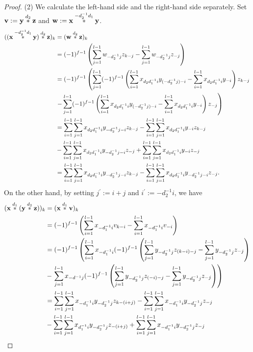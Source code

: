 \documentclass[a4paper, 11pt]{amsart}
\theoremstyle{plain}
\theoremstyle{definition}
\numberwithin{equation}{section}
\begin{document}
\begin{proof}
(2) We calculate the left-hand side and the right-hand side separately. 
Set ${\bf v}:={\bf y}\overset{d_2}{\ast}{\bf z}$ and ${\bf w}:={\bf x}\overset{-d_2^{-1}d_1}{\ast}{\bf y}$. 
\begin{align*}
(({\bf x}\overset{-d_2^{-1}d_1}{\ast}{\bf y})\overset{d_2}{\ast}{\bf z})_k&=({\bf w}\overset{d_2}{\ast}{\bf z})_k\\
&=(-1)^{f-1}\left( \sum_{j=1}^{l-1}w_{-d_2^{-1}j}z_{k-j} - \sum_{j=1}^{l-1}w_{-d_2^{-1}j}z_{-j} \right)\\
&=(-1)^{f-1}\left( \sum_{j=1}^{l-1}(-1)^{f-1}\left( \sum_{i=1}^{l-1}x_{d_2d_1^{-1}i}y_{(-d_2^{-1}j)-i} - \sum_{i=1}^{l-1}x_{d_2d_1^{-1}i}y_{-i} \right)z_{k-j}\right.\\
& \left. - \sum_{j=1}^{l-1}(-1)^{f-1}\left( \sum_{i=1}^{l-1}x_{d_2d_1^{-1}i}y_{(-d_2^{-1}j)-i} - \sum_{i=1}^{l-1}x_{d_2d_1^{-1}i}y_{-i} \right)z_{-j} \right)\\
&=\sum_{i=1}^{l-1}\sum_{j=1}^{l-1}x_{d_2d_1^{-1}i}y_{-d_2^{-1}j-i}z_{k-j} - \sum_{i=1}^{l-1}\sum_{j=1}^{l-1}x_{d_2d_1^{-1}i}y_{-i}z_{k-j} \\
&- \sum_{i=1}^{l-1}\sum_{j=1}^{l-1}x_{d_2d_1^{-1}i}y_{-d_2^{-1}j-i}z_{-j} + \sum_{i=1}^{l-1}\sum_{j=1}^{l-1}x_{d_2d_1^{-1}i}y_{-i}z_{-j}\\
&=\sum_{i=1}^{l-1}\sum_{j=1}^{l-1}x_{d_2d_1^{-1}i}y_{-d_2^{-1}j-i}z_{k-j} - \sum_{i=1}^{l-1}\sum_{j=1}^{l-1}x_{d_2d_1^{-1}i}y_{-d_2^{-1}j-i}z_{-j}.
\end{align*}
On the other hand, by setting $j^\prime :=i+j$ and $i^\prime:=-d_2^{-1}i$, we have
\begin{align*}
({\bf x}\overset{d_1}{\ast}({\bf y}\overset{d_2}{\ast}{\bf z}))_k&=({\bf x}\overset{d_1}{\ast}{\bf v})_k\\
&=(-1)^{f-1}\left( \sum_{i=1}^{l-1}x_{-d_1^{-1}i}v_{k-i} - \sum_{i=1}^{l-1}x_{-d_1^{-1}i}v_{-i} \right)\\
&=(-1)^{f-1} \left( \sum_{i=1}^{l-1}x_{-d_1^{-1}i}(-1)^{f-1}\left( \sum_{j=1}^{l-1}y_{-d_2^{-1}j}z_{(k-i)-j} - \sum_{j=1}^{l-1}y_{-d_2^{-1}j}z_{-j} \right) \right.\\
&- \left. \sum_{j=1}^{l-1}x_{-d^{-1}j}(-1)^{f-1} \left( \sum_{j=1}^{l-1}y_{-d_2^{-1}j}z_{(-i)-j} - \sum_{j=1}^{l-1}y_{-d_2^{-1}j}z_{-j} \right) \right)\\
&=\sum_{i=1}^{l-1}\sum_{j=1}^{l-1}x_{-d_1^{-1}i}y_{-d_2^{-1}j}z_{k-(i+j)} - \sum_{i=1}^{l-1}\sum_{j=1}^{l-1}x_{-d_1^{-1}i}y_{-d_2^{-1}j}z_{-j} \\
&- \sum_{i=1}^{l-1}\sum_{j=1}^{l-1}x_{d_1^{-1}i} y_{-d_2^{-1}j}z_{-(i+j)} + \sum_{i=1}^{l-1}\sum_{j=1}^{l-1}x_{-d_1^{-1}i}y_{-d_2^{-1}j}z_{-j}\\

\end{align*}
\end{proof}
\end{document}
